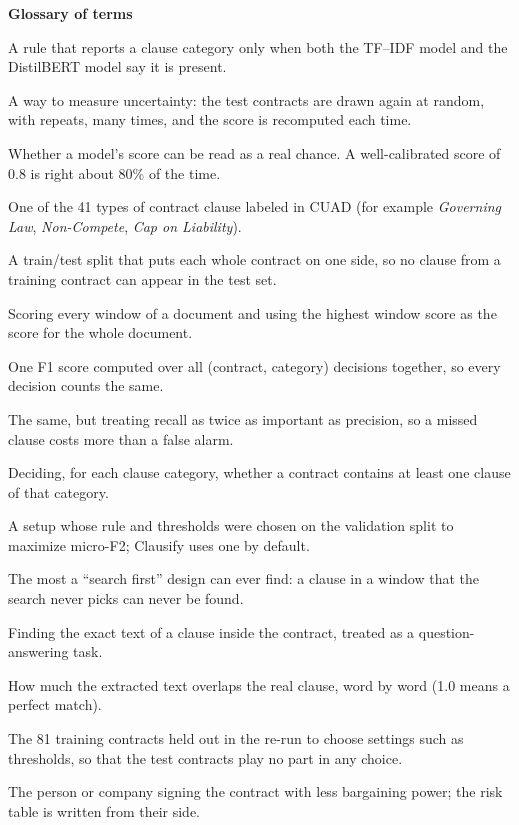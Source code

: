 \clearpage
\textbf{Glossary of terms}
\begin{description}[itemsep=4pt]
  \item[AND-ensemble] A rule that reports a clause category only when both the TF--IDF model and the DistilBERT model say it is present.
  \item[Bootstrap] A way to measure uncertainty: the test contracts are drawn again at random, with repeats, many times, and the score is recomputed each time.
  \item[Calibration] Whether a model's score can be read as a real chance. A well-calibrated score of 0.8 is right about 80\% of the time.
  \item[Clause category] One of the 41 types of contract clause labeled in CUAD (for example \emph{Governing Law}, \emph{Non-Compete}, \emph{Cap on Liability}).
  \item[Contract-level split] A train/test split that puts each whole contract on one side, so no clause from a training contract can appear in the test set.
  \item[Max-pooling (over windows)] Scoring every window of a document and using the highest window score as the score for the whole document.
  \item[Micro-F1] One F1 score computed over all (contract, category) decisions together, so every decision counts the same.
  \item[Micro-F2] The same, but treating recall as twice as important as precision, so a missed clause costs more than a false alarm.
  \item[Presence classification] Deciding, for each clause category, whether a contract contains at least one clause of that category.
  \item[Recall-first setting] A setup whose rule and thresholds were chosen on the validation split to maximize micro-F2; Clausify uses one by default.
  \item[Retrieval ceiling] The most a ``search first'' design can ever find: a clause in a window that the search never picks can never be found.
  \item[Span extraction] Finding the exact text of a clause inside the contract, treated as a question-answering task.
  \item[Token-F1] How much the extracted text overlaps the real clause, word by word (1.0 means a perfect match).
  \item[Validation split] The 81 training contracts held out in the re-run to choose settings such as thresholds, so that the test contracts play no part in any choice.
  \item[Weaker party] The person or company signing the contract with less bargaining power; the risk table is written from their side.
\end{description}
